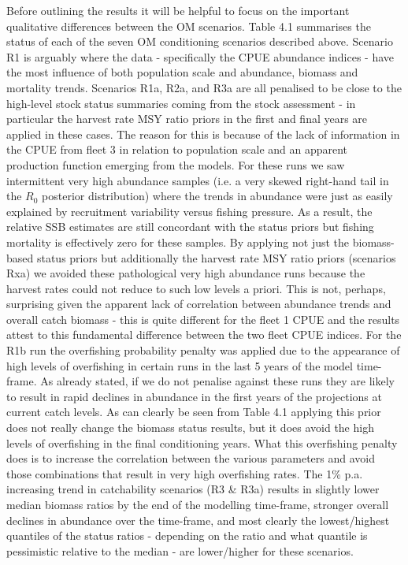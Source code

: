 \documentclass[12pt,a4paper,twoside,times,sky,standard]{csiroreport2017}
\begin{document}
Before outlining the results it will be helpful to focus on the important qualitative differences between the OM scenarios. Table 4.1 summarises the status of each of the seven OM conditioning scenarios described above. Scenario R1 is arguably where the data - specifically the CPUE abundance indices - have the most influence of both population scale and abundance, biomass and mortality trends. Scenarios R1a, R2a, and R3a are all penalised to be close to the high-level stock status summaries coming from the stock assessment \cite{albsa} - in particular the harvest rate MSY ratio priors in the first and final years are applied in these cases. The reason for this is because of the lack of information in the CPUE from fleet 3 in relation to population scale and an apparent production function emerging from the models. For these runs we saw intermittent very high abundance samples (i.e. a very skewed right-hand tail in the $R_0$ posterior distribution) where the trends in abundance were just as easily explained by recruitment variability versus fishing pressure. As a result, the relative SSB estimates are still concordant with the status priors but fishing mortality is effectively zero for these samples. By applying not just the biomass-based status priors but additionally the harvest rate MSY ratio priors (scenarios Rxa) we avoided these pathological very high abundance runs because the harvest rates could not reduce to such low levels a priori. This is not, perhaps, surprising given the apparent lack of correlation between abundance trends and overall catch biomass - this is quite different for the fleet 1 CPUE and the results attest to this fundamental difference between the two fleet CPUE indices. For the R1b run the overfishing probability penalty was applied due to the appearance of high levels of overfishing in certain runs in the last 5 years of the model time-frame. As already
stated, if we do not penalise against these runs they are likely to result in rapid declines in abundance in the first years of the projections at current catch levels. As can clearly be seen from Table 4.1 applying this prior does not really change the biomass status results, but it does avoid the high levels of overfishing in the final conditioning years. What this overfishing penalty does is to increase the correlation between the various parameters and avoid those combinations that result in very high overfishing rates. The 1\% p.a. increasing trend in catchability scenarios (R3 \& R3a) results in slightly lower median biomass ratios by the end of the modelling time-frame, stronger overall declines in abundance over the time-frame, and most clearly the lowest/highest quantiles of the status ratios - depending on the ratio and what quantile is pessimistic relative to the median - are lower/higher for these scenarios.
\end{document}
